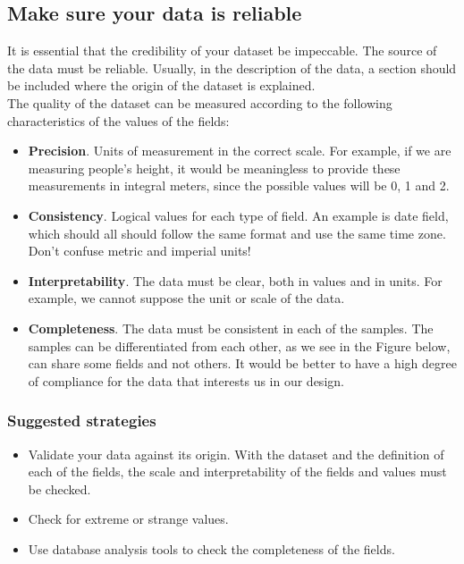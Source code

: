 \subsection{Make sure your data is reliable}

It is essential that the credibility of your dataset be impeccable. The source of the data must be reliable.
Usually, in the description of the data, a section should be included where the origin of the dataset is explained.\\

The quality of the dataset can be measured according to the following characteristics of the values of the fields:

\begin{itemize}
    \item \textbf{Precision}. Units of measurement in the correct scale. For example, if we are measuring people's height, it 
    would be meaningless to provide these measurements in integral meters, since the possible values will be 0, 1 and 2. \\

    \item \textbf{Consistency}. Logical values for each type of field. An example is date field, which should all should
    follow the same format and use the same time zone. Don't confuse metric and imperial units!\\

    \item \textbf{Interpretability}. The data must be clear, both in values and in units. For example, we cannot
    suppose the unit or scale of the data.

    \item \textbf{Completeness}. The data must be consistent in each of the samples. The samples can be differentiated
    from each other, as we see in the Figure below, can share some fields and not others. It would be
    better to have a high degree of compliance for the data that interests us in our design.
\end{itemize}

\subsubsection*{Suggested strategies} 

\begin{itemize}
    \item Validate your data against its origin. With the dataset and the definition
    of each of the fields, the scale and interpretability of the fields and values must be checked.
    \item Check for extreme or strange values.
    \item Use database analysis tools to check the completeness of the fields.
\end{itemize}

